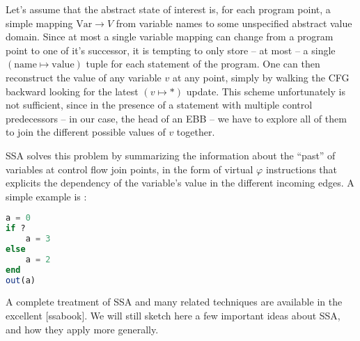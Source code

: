 \documentclass[11pt]{article}
\renewcommand{\phi}{\varphi}
\begin{document}
Let's assume that the abstract state of interest is, for each program point, a simple mapping $\text{Var}\to V$ from variable names to some unspecified abstract value domain. Since at most a single variable mapping can change from a program point to one of it's successor, it is tempting to only store -- at most -- a single $(\text{name}\mapsto\text{value})$ tuple for each statement of the program. One can then reconstruct the value of any variable $v$ at any point, simply by walking the CFG backward looking for the latest $(v\mapsto *)$ update. This scheme unfortunately is not sufficient, since in the presence of a statement with multiple control predecessors -- in our case, the head of an EBB -- we have to explore all of them to join the different possible values of $v$ together.

SSA solves this problem by summarizing the information about the ``past'' of variables at control flow join points, in the form of virtual $\phi$ instructions that explicits the dependency of the variable's value in the different incoming edges. A simple example is :

\begin{minipage}[t]{0.20\linewidth}
\begin{lstlisting}[language=julia]
a = 0
if ?
    a = 3
else
    a = 2
end
out(a)
\end{lstlisting}
\end{minipage}
\begin{minipage}[t]{0.30\linewidth}
\null
{}
\end{minipage}

A complete treatment of SSA and many related techniques are available in the excellent [ssabook]. We will still sketch here a few important ideas about SSA, and how they apply more generally.
\end{document}
